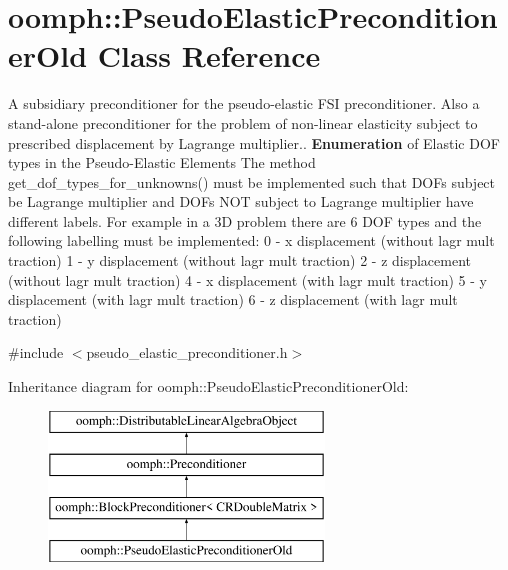 \hypertarget{classoomph_1_1PseudoElasticPreconditionerOld}{}\section{oomph\+:\+:Pseudo\+Elastic\+Preconditioner\+Old Class Reference}
\label{classoomph_1_1PseudoElasticPreconditionerOld}


A subsidiary preconditioner for the pseudo-\/elastic F\+SI preconditioner. Also a stand-\/alone preconditioner for the problem of non-\/linear elasticity subject to prescribed displacement by Lagrange multiplier.. {\bfseries Enumeration} of Elastic D\+OF types in the Pseudo-\/\+Elastic Elements The method get\+\_\+dof\+\_\+types\+\_\+for\+\_\+unknowns() must be implemented such that D\+O\+Fs subject be Lagrange multiplier and D\+O\+Fs N\+OT subject to Lagrange multiplier have different labels. For example in a 3D problem there are 6 D\+OF types and the following labelling must be implemented\+: 0 -\/ x displacement (without lagr mult traction) 1 -\/ y displacement (without lagr mult traction) 2 -\/ z displacement (without lagr mult traction) 4 -\/ x displacement (with lagr mult traction) 5 -\/ y displacement (with lagr mult traction) 6 -\/ z displacement (with lagr mult traction)  




{\ttfamily \#include $<$pseudo\+\_\+elastic\+\_\+preconditioner.\+h$>$}

Inheritance diagram for oomph\+:\+:Pseudo\+Elastic\+Preconditioner\+Old\+:\begin{figure}[H]
\begin{center}
\leavevmode
\includegraphics[height=4.000000cm]{classoomph_1_1PseudoElasticPreconditionerOld}
\end{center}
\end{figure}
